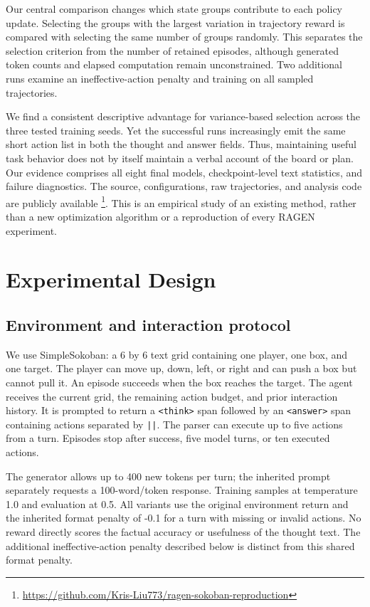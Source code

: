 \documentclass[10pt,twocolumn,letterpaper]{article}
\begin{document}
Our central comparison changes which state groups contribute to each policy update. Selecting the groups with the largest variation in trajectory reward is compared with selecting the same number of groups randomly. This separates the selection criterion from the number of retained episodes, although generated token counts and elapsed computation remain unconstrained. Two additional runs examine an ineffective-action penalty and training on all sampled trajectories.

We find a consistent descriptive advantage for variance-based selection across the three tested training seeds. Yet the successful runs increasingly emit the same short action list in both the thought and answer fields. Thus, maintaining useful task behavior does not by itself maintain a verbal account of the board or plan. Our evidence comprises all eight final models, checkpoint-level text statistics, and failure diagnostics. The source, configurations, raw trajectories, and analysis code are publicly available \footnote{\url{https://github.com/Kris-Liu773/ragen-sokoban-reproduction}}. This is an empirical study of an existing method, rather than a new optimization algorithm or a reproduction of every RAGEN experiment.

\section{Experimental Design}\label{sec:design}
\subsection{Environment and interaction protocol}
We use SimpleSokoban: a 6 by 6 text grid containing one player, one box, and one target. The player can move up, down, left, or right and can push a box but cannot pull it. An episode succeeds when the box reaches the target. The agent receives the current grid, the remaining action budget, and prior interaction history. It is prompted to return a \texttt{<think>} span followed by an \texttt{<answer>} span containing actions separated by \texttt{||}. The parser can execute up to five actions from a turn. Episodes stop after success, five model turns, or ten executed actions.

The generator allows up to 400 new tokens per turn; the inherited prompt separately requests a 100-word/token response. Training samples at temperature 1.0 and evaluation at 0.5. All variants use the original environment return and the inherited format penalty of -0.1 for a turn with missing or invalid actions. No reward directly scores the factual accuracy or usefulness of the thought text. The additional ineffective-action penalty described below is distinct from this shared format penalty.
\end{document}
